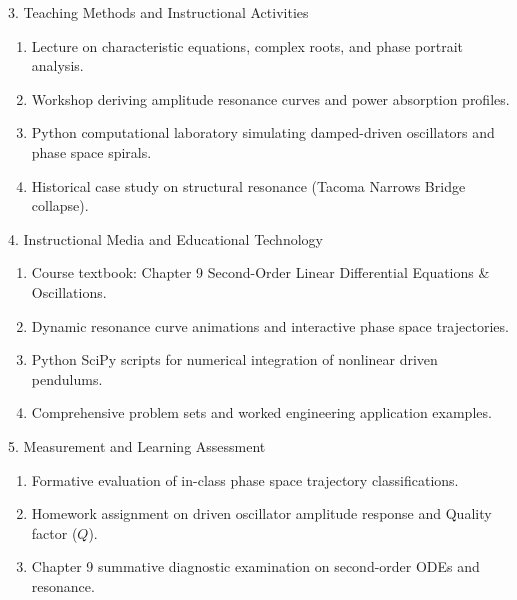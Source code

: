 \newpage

\begin{planbox}[colframe=rbruNavy!85!black, colbacktitle=rbruNavy!85!black]{3. Teaching Methods and Instructional Activities}
\begin{enumerate}[topsep=2pt, itemsep=1pt, partopsep=0pt, parsep=0pt, leftmargin=1.5em]
    \item Lecture on characteristic equations, complex roots, and phase portrait analysis.
    \item Workshop deriving amplitude resonance curves and power absorption profiles.
    \item Python computational laboratory simulating damped-driven oscillators and phase space spirals.
    \item Historical case study on structural resonance (Tacoma Narrows Bridge collapse).
\end{enumerate}
\end{planbox}

\begin{planbox}[colframe=rbruGold!90!black, colbacktitle=rbruGold!90!black]{4. Instructional Media and Educational Technology}
\begin{enumerate}[topsep=2pt, itemsep=1pt, partopsep=0pt, parsep=0pt, leftmargin=1.5em]
    \item Course textbook: Chapter 9 Second-Order Linear Differential Equations \& Oscillations.
    \item Dynamic resonance curve animations and interactive phase space trajectories.
    \item Python SciPy scripts for numerical integration of nonlinear driven pendulums.
    \item Comprehensive problem sets and worked engineering application examples.
\end{enumerate}
\end{planbox}

\begin{planbox}[colframe=rbruSlate, colbacktitle=rbruSlate]{5. Measurement and Learning Assessment}
\begin{enumerate}[topsep=2pt, itemsep=1pt, partopsep=0pt, parsep=0pt, leftmargin=1.5em]
    \item Formative evaluation of in-class phase space trajectory classifications.
    \item Homework assignment on driven oscillator amplitude response and Quality factor ($Q$).
    \item Chapter 9 summative diagnostic examination on second-order ODEs and resonance.
\end{enumerate}
\end{planbox}
\clearpage

